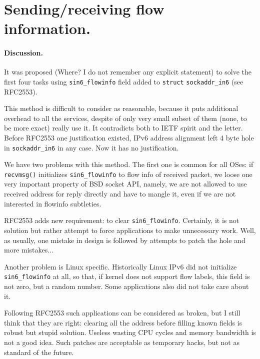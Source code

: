 \section{Sending/receiving flow information.}

\paragraph{Discussion.}
It was proposed (Where? I do not remember any explicit statement)
to solve the first four tasks using
\verb|sin6_flowinfo| field added to \verb|struct| \verb|sockaddr_in6|
(see RFC2553).

\begin{NB}
	This method is difficult to consider as reasonable, because it
	puts additional overhead to all the services, despite of only
	very small subset of them (none, to be more exact) really use it.
	It contradicts both to IETF spirit and the letter. Before RFC2553
	one justification existed, IPv6 address alignment left 4 byte
	hole in \verb|sockaddr_in6| in any case. Now it has no justification.
\end{NB}

We have two problems with this method. The first one is common for all OSes:
if \verb|recvmsg()| initializes \verb|sin6_flowinfo| to flow info
of received packet, we loose one very important property of BSD socket API,
namely, we are not allowed to use received address for reply directly
and have to mangle it, even if we are not interested in flowinfo subtleties.

\begin{NB}
	RFC2553 adds new requirement: to clear \verb|sin6_flowinfo|.
	Certainly, it is not solution but rather attempt to force applications
	to make unnecessary work. Well, as usually, one mistake in design
	is followed by attempts	to patch the hole and more mistakes...
\end{NB}

Another problem is Linux specific. Historically Linux IPv6 did not
initialize \verb|sin6_flowinfo| at all, so that, if kernel does not
support flow labels, this field is not zero, but a random number.
Some applications also did not take care about it. 

\begin{NB}
Following RFC2553 such applications can be considered as broken,
but I still think that they are right: clearing all the address
before filling known fields is robust but stupid solution.
Useless wasting CPU cycles and
memory bandwidth is not a good idea. Such patches are acceptable
as temporary hacks, but not as standard of the future.
\end{NB}


